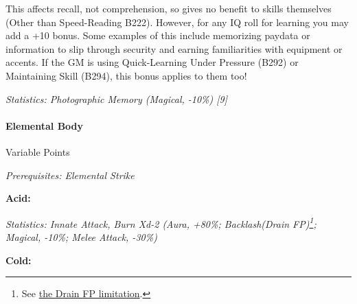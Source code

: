 \begin{multicols}{3}
	This affects recall, not comprehension, so gives no benefit to skills themselves (Other than Speed-Reading B222). However, for any IQ roll for learning you may add a +10 bonus. Some examples of this include memorizing paydata or information to slip through security and earning familiarities with equipment or accents. If the GM is using Quick-Learning Under Pressure (B292) or Maintaining Skill (B294), this bonus applies to them too!

	\textcolor{OliveGreen}{\textit{Statistics: Photographic Memory (Magical, -10\%) [9] }}
	
	\paragraph{Elemental Body}
	\begin{flushright}
		Variable Points
	\end{flushright}
	\begin{flushright}
		\textit{Prerequisites: Elemental Strike}
	\end{flushright}
	
	
	\begin{center} 
	\begin{adjustwidth}{-3mm}{}
		\end{adjustwidth}
	\end{center}
	
	\textbf{Acid:}
	
	\textcolor{OliveGreen}{\textit{Statistics: Innate Attack, Burn Xd-2 (Aura, +80\%; Backlash(Drain FP)\footnote{See \hyperref[drain_mods]{the Drain FP limitation}.}; Magical, -10\%; Melee Attack, -30\%) }}
	
	\textbf{Cold:}
	

\end{multicols}
